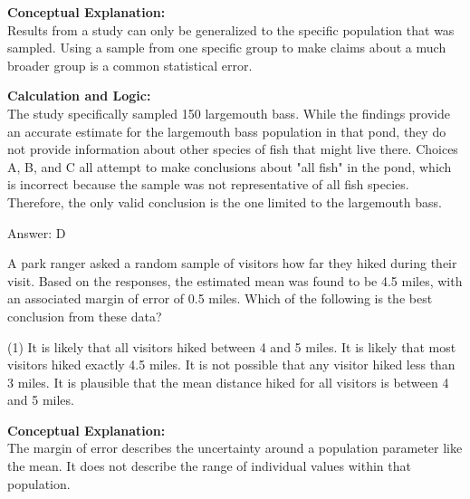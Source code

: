 \documentclass[11pt,paper=a4,answers]{exam}
\begin{document}
\begin{questions}
\begin{solution}
\textbf{Conceptual Explanation:} \\
Results from a study can only be generalized to the specific population that was sampled. Using a sample from one specific group to make claims about a much broader group is a common statistical error.

\vspace{30pt}

\textbf{Calculation and Logic:} \\
The study specifically sampled 150 largemouth bass. While the findings provide an accurate estimate for the largemouth bass population in that pond, they do not provide information about other species of fish that might live there. Choices A, B, and C all attempt to make conclusions about "all fish" in the pond, which is incorrect because the sample was not representative of all fish species. Therefore, the only valid conclusion is the one limited to the largemouth bass.

\vspace{30pt}

Answer: \colorbox{yellow!100}{D}
\end{solution}

\vspace{60pt}

\question
A park ranger asked a random sample of visitors how far they hiked during their visit. Based on the responses, the estimated mean was found to be 4.5 miles, with an associated margin of error of 0.5 miles. Which of the following is the best conclusion from these data?
\begin{tasks}(1)
    \task It is likely that all visitors hiked between 4 and 5 miles.
    \task It is likely that most visitors hiked exactly 4.5 miles.
    \task It is not possible that any visitor hiked less than 3 miles.
    \task It is plausible that the mean distance hiked for all visitors is between 4 and 5 miles.
\end{tasks}

\begin{solution}
\textbf{Conceptual Explanation:} \\
The margin of error describes the uncertainty around a population parameter like the mean. It does not describe the range of individual values within that population.

\vspace{30pt}


\end{solution}
\end{questions}
\end{document}
